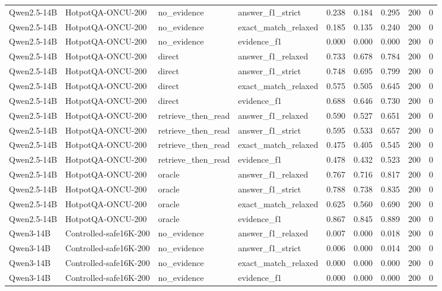 \begin{tabular}{llllrrrrr}
Qwen2.5-14B & HotpotQA-ONCU-200 & no_evidence & answer_f1_strict & 0.238 & 0.184 & 0.295 & 200 & 0 \\
Qwen2.5-14B & HotpotQA-ONCU-200 & no_evidence & exact_match_relaxed & 0.185 & 0.135 & 0.240 & 200 & 0 \\
Qwen2.5-14B & HotpotQA-ONCU-200 & no_evidence & evidence_f1 & 0.000 & 0.000 & 0.000 & 200 & 0 \\
Qwen2.5-14B & HotpotQA-ONCU-200 & direct & answer_f1_relaxed & 0.733 & 0.678 & 0.784 & 200 & 0 \\
Qwen2.5-14B & HotpotQA-ONCU-200 & direct & answer_f1_strict & 0.748 & 0.695 & 0.799 & 200 & 0 \\
Qwen2.5-14B & HotpotQA-ONCU-200 & direct & exact_match_relaxed & 0.575 & 0.505 & 0.645 & 200 & 0 \\
Qwen2.5-14B & HotpotQA-ONCU-200 & direct & evidence_f1 & 0.688 & 0.646 & 0.730 & 200 & 0 \\
Qwen2.5-14B & HotpotQA-ONCU-200 & retrieve_then_read & answer_f1_relaxed & 0.590 & 0.527 & 0.651 & 200 & 0 \\
Qwen2.5-14B & HotpotQA-ONCU-200 & retrieve_then_read & answer_f1_strict & 0.595 & 0.533 & 0.657 & 200 & 0 \\
Qwen2.5-14B & HotpotQA-ONCU-200 & retrieve_then_read & exact_match_relaxed & 0.475 & 0.405 & 0.545 & 200 & 0 \\
Qwen2.5-14B & HotpotQA-ONCU-200 & retrieve_then_read & evidence_f1 & 0.478 & 0.432 & 0.523 & 200 & 0 \\
Qwen2.5-14B & HotpotQA-ONCU-200 & oracle & answer_f1_relaxed & 0.767 & 0.716 & 0.817 & 200 & 0 \\
Qwen2.5-14B & HotpotQA-ONCU-200 & oracle & answer_f1_strict & 0.788 & 0.738 & 0.835 & 200 & 0 \\
Qwen2.5-14B & HotpotQA-ONCU-200 & oracle & exact_match_relaxed & 0.625 & 0.560 & 0.690 & 200 & 0 \\
Qwen2.5-14B & HotpotQA-ONCU-200 & oracle & evidence_f1 & 0.867 & 0.845 & 0.889 & 200 & 0 \\
Qwen3-14B & Controlled-safe16K-200 & no_evidence & answer_f1_relaxed & 0.007 & 0.000 & 0.018 & 200 & 0 \\
Qwen3-14B & Controlled-safe16K-200 & no_evidence & answer_f1_strict & 0.006 & 0.000 & 0.014 & 200 & 0 \\
Qwen3-14B & Controlled-safe16K-200 & no_evidence & exact_match_relaxed & 0.000 & 0.000 & 0.000 & 200 & 0 \\
Qwen3-14B & Controlled-safe16K-200 & no_evidence & evidence_f1 & 0.000 & 0.000 & 0.000 & 200 & 0 \\

\end{tabular}
